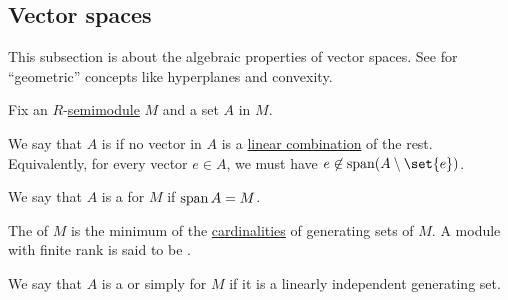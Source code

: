 \subsection{Vector spaces}\label{subsec:vector_spaces}

This subsection is about the algebraic properties of vector spaces. See  for \enquote{geometric} concepts like hyperplanes and convexity.

\begin{definition}\label{def:semimodule_basis}
  Fix an \( R \)-\hyperref[def:semimodule]{semimodule} \( M \) and a set \( A \) in \( M \).

  \begin{thmenum}
     We say that \( A \) is  if no vector in \( A \) is a \hyperref[def:linear_combinatoin]{linear combination} of the rest. Equivalently, for every vector \( e \in A \), we must have \( e \not\in \linspan(A \setminus \set{ e }) \).

     We say that \( A \) is a  for \( M \) if \( \operatorname{span}{ A } = M \).

    The  of \( M \) is the minimum of the \hyperref[thm:cardinality_existence]{cardinalities} of generating sets of \( M \). A module with finite rank is said to be .

     We say that \( A \) is a  or simply  for \( M \) if it is a linearly independent generating set.
  \end{thmenum}
\end{definition}

